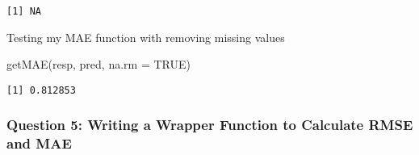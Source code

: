 \documentclass[
  letterpaper,
  DIV=11,
  numbers=noendperiod]{scrartcl}
\newenvironment{Shaded}{\begin{snugshade}}{\end{snugshade}}
\newcommand{\AttributeTok}[1]{\textcolor[rgb]{0.40,0.45,0.13}{#1}}
\newcommand{\ConstantTok}[1]{\textcolor[rgb]{0.56,0.35,0.01}{#1}}
\newcommand{\FunctionTok}[1]{\textcolor[rgb]{0.28,0.35,0.67}{#1}}
\newcommand{\NormalTok}[1]{\textcolor[rgb]{0.00,0.23,0.31}{#1}}
\begin{document}
\begin{verbatim}
[1] NA
\end{verbatim}

Testing my MAE function with removing missing values

\begin{Shaded}
\begin{Highlighting}[]
\FunctionTok{getMAE}\NormalTok{(resp, pred, }\AttributeTok{na.rm =} \ConstantTok{TRUE}\NormalTok{)}
\end{Highlighting}
\end{Shaded}

\begin{verbatim}
[1] 0.812853
\end{verbatim}

\subsubsection{Question 5: Writing a Wrapper Function to Calculate RMSE
and
MAE}\label{question-5-writing-a-wrapper-function-to-calculate-rmse-and-mae}
\end{document}

